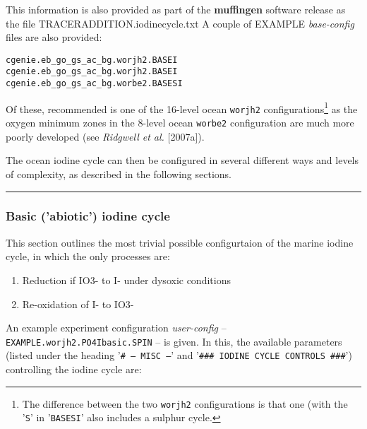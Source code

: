 \documentclass[11pt,fleqn]{book} %
\begin{document}
This information is also provided as part of the \textbf{muffingen} software release as the file \textsf{\footnotesize TRACERADDITION.iodinecycle.txt} 
A couple of EXAMPLE \textit{base-config} files are also provided:
\vspace{-1mm}\small\begin{verbatim}
cgenie.eb_go_gs_ac_bg.worjh2.BASEI
cgenie.eb_go_gs_ac_bg.worjh2.BASEI
cgenie.eb_go_gs_ac_bg.worbe2.BASESI
\end{verbatim}\normalsize\vspace{-1mm}
Of these, recommended is one of the 16-level ocean \texttt{worjh2} configurations\footnote{The difference between the two \texttt{worjh2} configurations is that one (with the '\texttt{S}' in '\texttt{BASESI}' also includes a sulphur cycle.} as the oxygen minimum zones in the 8-level ocean \texttt{worbe2} configuration are much more poorly developed (see \textit{Ridgwell et al.} [2007a]).

The ocean iodine cycle can then be configured in several different ways and levels of complexity, as described in the following sections.

%
\noindent\rule{4cm}{0.5pt}
\subsubsection{Basic ('abiotic') iodine cycle}
\vspace{1mm}

This section outlines the most trivial possible configurtaion of the marine iodine cycle, in which the only processes are:
\begin{enumerate}[noitemsep]
\vspace{1mm}
\item Reduction if IO3- to I- under dysoxic conditions
\vspace{1mm}
\item Re-oxidation of I- to IO3-
\end{enumerate}
\vspace{1mm}

\noindent An example experiment configuration \textit{user-config} -- \texttt{EXAMPLE.worjh2.PO4Ibasic.SPIN} -- is given. In this, the available parameters (listed under the heading '\texttt{\# --- MISC ---}' and '\texttt{\#\#\# IODINE CYCLE CONTROLS \#\#\#}') controlling the iodine cycle are:
\end{document}
